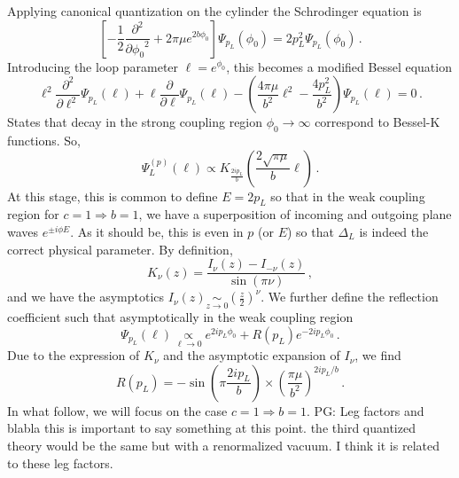 \documentclass[a4paper]{article}
\newcommand{\purple}[1]{{\color{purple} #1 \color{black}}}
\newcommand{\PG}[1]{{\purple{PG: #1}}} %
\begin{document}
Applying canonical quantization on the cylinder the Schrodinger equation is\begin{equation}\label{eq:Schrodinger}
 \left[-\frac{1}{2}\frac{\partial^2}{\partial{\phi_0}^2}+2\pi \mu e^{2b\phi_0}\right]\Psi_{p_L}(\phi_0)=2 p_L^2 \Psi_{p_L}(\phi_0)\,.
\end{equation}
Introducing the loop parameter $\ell = e^{\phi_0}$, this becomes a modified Bessel equation
\begin{equation}\label{eq:Wheeler-De-Witt-spacelike}
  \ell^2\frac{\partial^2}{\partial{\ell}^2}\Psi_{p_L}(\ell)+\ell\frac{\partial}{\partial{\ell}}\Psi_{p_L}(\ell)-\left(\frac{4\pi\mu}{b^2}\ell^2-\frac{4p_L^2}{b^2}\right)\Psi_{p_L}(\ell)=0\,.
\end{equation}
States that decay in the strong coupling region $\phi_0\to \infty$ correspond to Bessel-K functions. So,
\begin{equation}
  \Psi^{(p)}_L(\ell) \propto K_{\frac{2ip_L}{b}}\left(\frac{2\sqrt{\pi\mu}}{b}\ell\right)\,.
\end{equation}
At this stage, this is common to define $E = 2p_L$ so that in the weak coupling region for $c=1 \Rightarrow b=1$, we have a superposition of incoming and outgoing plane waves $e^{\pm i\phi E}$. As it should be, this is even in $p$ (or $E$) so that $\Delta_L$ is indeed the correct physical parameter. By definition,
\begin{equation}
  K_{\nu}(z)=\frac{I_{\nu}(z)-I_{-\nu}(z)}{\sin(\pi \nu)}\,,
\end{equation}
and we have the asymptotics $I_{\nu}(z)\underset{z\to 0}{\sim} \left(\frac{z}{2}\right)^\nu$. We further define the reflection coefficient such that asymptotically in the weak coupling region
\begin{equation}
  \Psi_{p_L}(\ell) \underset{\ell \to 0}{\propto} e^{2ip_L\phi_0}+ R(p_L)e^{-2ip_L\phi_0}\,.
\end{equation}
Due to the expression of $K_\nu$ and the asymptotic expansion of $I_\nu$, we find
\begin{equation}
  R(p_L)=-\sin\left(\pi\frac{2ip_L}{b}\right)\times \left(\frac{\pi \mu}{b^2}\right)^{2ip_L/b}\,.
\end{equation}
In what follow, we will focus on the case $c=1\Rightarrow b=1$.
\PG{Leg factors and blabla this is important to say something at this point. the third quantized theory would be the same but with a renormalized vacuum. I think it is related to these leg factors.}
\end{document}
